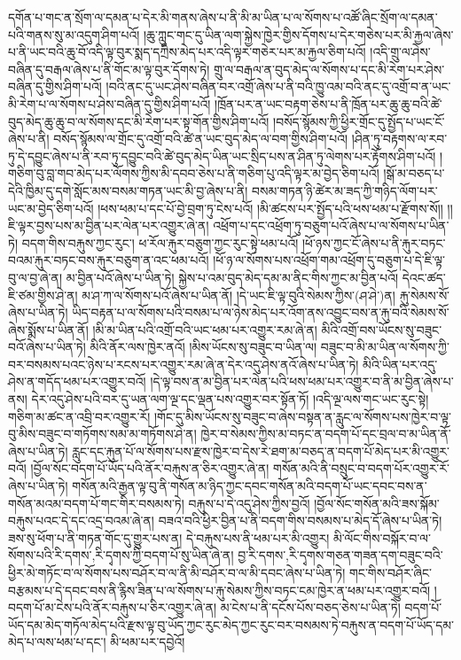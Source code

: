 དགོན་པ་གང་ན་སྲོག་ལ་དམན་པ་དེར་མི་གནས་ཞེས་པ་ནི་མི་མ་ཡིན་པ་ལ་སོགས་པ་འཚོ་ཞིང་སྲོག་ལ་དམན་པའི་གནས་སུ་མ་འདུག་ཤིག་པའོ། །ཆུ་ཀླུང་གང་དུ་ཡིན་ལག་སྐྱེས་ཁྱེར་གྱིས་དོགས་པ་དེར་གཅེས་པར་མི་རྐྱལ་ཞེས་པ་ནི་ཡང་བའི་ཆུ་བོ་འདི་ལྟ་བུར་སྨད་དཀྲིས་མེད་པར་འདི་ལྟར་གཅེར་པར་མ་རྐྱལ་ཅིག་པའོ། །འདི་གྲུ་ལ་ཤེས་བཞིན་དུ་བརྒལ་ཞེས་པ་ནི་གོང་མ་ལྟ་བུར་དོགས་ཏེ། གྲུ་ལ་བརྒལ་ན་བུད་མེད་ལ་སོགས་པ་དང་མི་རེག་པར་ཤེས་བཞིན་དུ་གྱིས་ཤིག་པའོ། །བའི་ནང་དུ་ཡང་ཤེས་བཞིན་བར་འགྲོ་ཞེས་པ་ནི་བའི་ཁྱུ་འམ་བའི་ནང་དུ་འགྲོ་བ་ན་ཡང་མི་རེག་པ་ལ་སོགས་པ་ཤེས་བཞིན་དུ་གྱིས་ཤིག་པའོ། །ཁྲོན་པར་ན་ཡང་བརྟག་ཅེས་པ་ནི་ཁྲོན་པར་ཆུ་ཆུ་བའི་ཚེ་བུད་མེད་ཆུ་ཆུ་བ་ལ་སོགས་དང་མི་རེག་པར་སྟ་གོན་གྱིས་ཤིག་པའོ། །བསོད་སྙོམས་ཀྱི་ཕྱིར་གྲོང་དུ་སྤྱོད་པ་ཡང་ངོ་ཞེས་པ་ནི། བསོད་སྙོམས་ལ་གྲོང་དུ་འགྲོ་བའི་ཚེ་ན་ཡང་བུད་མེད་ལ་བག་གྱིས་ཤིག་པའོ། །ཤིན་ཏུ་བརྟགས་ལ་རབ་ཏུ་དེ་དབྱུང་ཞེས་པ་ནི་རབ་ཏུ་དབྱུང་བའི་ཚེ་བུད་མེད་ཡིན་ཡང་སྲིད་པས་ན་ཤིན་ཏུ་ལེགས་པར་རྟོགས་ཤིག་པའོ། །གཅིག་བུ་བླ་གབ་མེད་པར་ལོགས་ཀྱིས་མི་དབབ་ཅེས་པ་ནི་གཅིག་པུ་འདི་ལྟར་མ་བྱེད་ཅིག་པའོ། །སྒོ་མ་བཅད་པ་དེའི་ཁྱིམ་དུ་དགེ་སློང་མས་བསམ་གཏན་ཡང་མི་བྱ་ཞེས་པ་ནི། བསམ་གཏན་ཉི་ཚེར་མ་ཟད་ཀྱི་གཉིད་ལོག་པར་ཡང་མ་བྱེད་ཅིག་པའོ། །ཕས་ཕམ་པ་དང་པོ་བྱེ་བྲག་ཏུ་ངེས་པའོ། །མི་ཚངས་པར་སྤྱོད་པའི་ཕས་ཕམ་པ་རྫོགས་སོ།། །།ཇི་ལྟར་བྱས་པས་མ་བྱིན་པར་ལེན་པར་འགྱུར་ཞེ་ན། འཕྲོག་པ་དང་འཕྲོག་ཏུ་བཅུག་པའོ་ཞེས་པ་ལ་སོགས་པ་ཡིན་ཏེ། བདག་གིས་བརྐུས་ཀྱང་རུང་། ཕ་རོལ་རྐུར་བཅུག་ཀྱང་རུང་སྟེ་ཕམ་པའོ། །ཕོ་ཉས་ཀྱང་ངོ་ཞེས་པ་ནི་རྐུར་བཏང་བའམ་རྐུར་བཏང་བས་རྐུར་བཅུག་ན་འང་ཕམ་པའོ། །ཕོ་ཉ་ལ་སོགས་པས་འཕྲོག་གམ་འཕྲོག་དུ་བཅུག་པ་དེ་ཇི་ལྟ་བུ་ལ་བྱ་ཞེ་ན། མ་བྱིན་པའོ་ཞེས་པ་ཡིན་ཏེ། སྐྱེས་པ་འམ་བུད་མེད་དམ་མ་ནིང་གིས་ཀྱང་མ་བྱིན་པའོ། དེའང་ཚད་ཇི་ཙམ་གྱིས་ཤེ་ན། མ་ཤ་ཀ་ལ་སོགས་པའོ་ཞེས་པ་ཡིན་ནོ། །དེ་ཡང་ཇི་ལྟ་བུའི་སེམས་ཀྱིས་(ཤ་ཤེ་)ན། རྐུ་སེམས་སོ་ཞེས་པ་ཡིན་ཏེ། ཡིད་བརྟན་པ་ལ་སོགས་པའི་བསམ་པ་ལ་ཉེས་མེད་པར་འོག་ནས་འབྱུང་བས་ན་རྐུ་བའི་སེམས་སོ་ཞེས་སྨོས་པ་ཡིན་ནོ། །མི་མ་ཡིན་པའི་འགྲོ་བའི་ཡང་ཕམ་པར་འགྱུར་རམ་ཞེ་ན། མིའི་འགྲོ་བས་ཡོངས་སུ་བཟུང་བའོ་ཞེས་པ་ཡིན་ཏེ། མིའི་ནོར་ལས་ཁྱེར་ནའོ། །མིས་ཡོངས་སུ་བཟུང་བ་ཡིན་ལ། བཟུང་བ་མི་མ་ཡིན་ལ་སོགས་ཀྱི་བར་བསམས་པའང་ཉེས་པ་རངས་པར་འགྱུར་རམ་ཞེ་ན་དེར་འདུ་ཤེས་ནའོ་ཞེས་པ་ཡིན་ཏེ། མིའི་ཡིན་པར་འདུ་ཤེས་ན་གདོད་ཕམ་པར་འགྱུར་བའོ། །དེ་ལྟ་བས་ན་མ་བྱིན་པར་ལེན་པའི་ཕས་ཕམ་པར་འགྱུར་བ་ནི་མ་བྱིན་ཞེས་པ་ནས། དེར་འདུ་ཤེས་པའི་བར་དུ་ཡན་ལག་ལྔ་དང་ལྡན་པས་འགྱུར་བར་སྟོན་ཏོ། །འདི་ལྔ་ལས་གང་ཡང་རུང་སྟེ། གཅིག་མ་ཚང་ན་འབྲི་བར་འགྱུར་རོ། །གོང་དུ་མིས་ཡོངས་སུ་བཟུང་བ་ཞེས་བསྟན་ན་རླུང་ལ་སོགས་པས་ཁྱེར་བ་ལྟ་བུ་མིས་བཟུང་བ་གཏོགས་སམ་མ་གཏོགས་ཤེ་ན། ཁྱེར་བ་སེམས་ཀྱིས་མ་བཏང་ན་བདག་པོ་དང་བྲལ་བ་མ་ཡིན་ནོ་ཞེས་པ་ཡིན་ཏེ། རླུང་དང་རྐུན་པོ་ལ་སོགས་པས་རྫས་ཁྱེར་བ་དེས་རེ་ཐག་མ་བཅད་ན་བདག་པོ་མེད་པར་མི་འགྱུར་བའོ། །བྱོལ་སོང་བདག་པོ་ཡོད་པའི་ནོར་བརྐུས་ན་ཅིར་འགྱུར་ཞེ་ན། གསོན་མའི་ནི་བསྲུང་བ་བདག་པོར་འགྱུར་རོ་ཞེས་པ་ཡིན་ཏེ། གསོན་མའི་རྒྱན་ལྟ་བུ་ནི་གསོན་མ་ཉིད་ཀྱང་དབང་གསོན་མའི་བདག་པོ་ཡང་དབང་བས་ན་གསོན་མའམ་བདག་པོ་གང་གིར་བསམས་ཏེ། བརྐུས་པ་དེ་འདུ་ཤེས་ཀྱིས་བྱའོ། །བྱོལ་སོང་གསོན་མའི་ཟས་སྐོམ་བརྐུས་པའང་དེ་དང་འདྲ་བའམ་ཞེ་ན། བཟའ་བའི་ཕྱིར་བྱིན་པ་ནི་བདག་གིས་བསམས་པ་མེད་དོ་ཞེས་པ་ཡིན་ཏེ། ཟས་སུ་ཕོག་པ་ནི་གཏན་གོང་དུ་གྱུར་པས་ན། དེ་བརྐུས་པས་ནི་ཕམ་པར་མི་འགྱུར། མི་ལོང་གིས་བསྐོར་བ་ལ་སོགས་པའི་{རི་དགས་,རི་དྭགས་}ཀྱི་བདག་པོ་སུ་ཡིན་ཞེ་ན། བྱ་{རི་དགས་,རི་དྭགས་}གཅན་གཟན་དག་བཟུང་བའི་ཕྱིར་མེ་གཏོང་བ་ལ་སོགས་པས་བཤོར་བ་ལ་ནི་མི་བཤོར་བ་ལ་མི་དབང་ཞེས་པ་ཡིན་ཏེ། གང་གིས་བཤོར་ཞིང་བརྩམས་པ་དེ་དབང་བས་ནི་རྙིས་ཟིན་པ་ལ་སོགས་པ་རྐུ་སེམས་ཀྱིས་བཏང་ངམ་ཁྱེར་ན་ཕམ་པར་འགྱུར་བའོ། །བདག་པོ་མ་ངེས་པའི་ནོར་བརྐུས་པ་ཅིར་འགྱུར་ཞེ་ན། མ་ངེས་པ་ནི་དངོས་པོས་བཅད་ཅེས་པ་ཡིན་ཏེ། བདག་པོ་ཡོད་དམ་མེད་གཏོལ་མེད་པའི་རྫས་ལྟ་བུ་ཡོད་ཀྱང་རུང་མེད་ཀྱང་རུང་བར་བསམས་ཏེ་བརྐུས་ན་བདག་པོ་ཡོད་དམ་མེད་པ་ལས་ཕམ་པ་དང་། མི་ཕམ་པར་དབྱེའོ། 